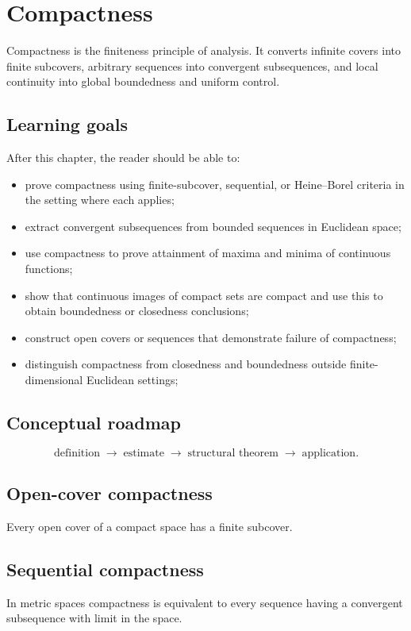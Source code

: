 \chapter{Compactness}
\label{ch:ii06}

Compactness is the finiteness principle of analysis. It converts infinite covers into finite subcovers, arbitrary sequences into convergent subsequences, and local continuity into global boundedness and uniform control.

\section*{Learning goals}
After this chapter, the reader should be able to:
\begin{itemize}
\item prove compactness using finite-subcover, sequential, or Heine--Borel criteria in the setting where each applies;
\item extract convergent subsequences from bounded sequences in Euclidean space;
\item use compactness to prove attainment of maxima and minima of continuous functions;
\item show that continuous images of compact sets are compact and use this to obtain boundedness or closedness conclusions;
\item construct open covers or sequences that demonstrate failure of compactness;
\item distinguish compactness from closedness and boundedness outside finite-dimensional Euclidean settings;
\end{itemize}
\section*{Conceptual roadmap}
\[
\boxed{\text{definition}\;\longrightarrow\;\text{estimate}\;\longrightarrow\;\text{structural theorem}\;\longrightarrow\;\text{application}.}
\]

\section{Open-cover compactness}
Every open cover of a compact space has a finite subcover.

\section{Sequential compactness}
In metric spaces compactness is equivalent to every sequence having a convergent subsequence with limit in the space.


